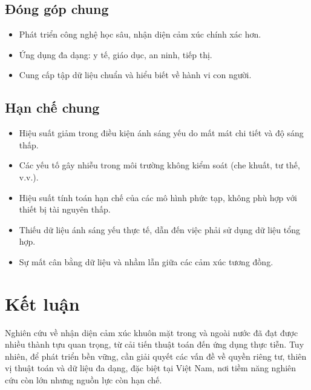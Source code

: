 \subsection*{Đóng góp chung}
\begin{itemize}
    \item Phát triển công nghệ học sâu, nhận diện cảm xúc chính xác hơn.
    \item Ứng dụng đa dạng: y tế, giáo dục, an ninh, tiếp thị.
    \item Cung cấp tập dữ liệu chuẩn và hiểu biết về hành vi con người.
\end{itemize}

\subsection*{Hạn chế chung}
\begin{itemize}
    \item  Hiệu suất giảm trong điều kiện ánh sáng yếu do mất mát chi tiết và độ sáng thấp.
    \item  Các yếu tố gây nhiễu trong môi trường không kiểm soát (che khuất, tư thế, v.v.).
    \item  Hiệu suất tính toán hạn chế của các mô hình phức tạp, không phù hợp với thiết bị tài nguyên thấp.
    \item  Thiếu dữ liệu ánh sáng yếu thực tế, dẫn đến việc phải sử dụng dữ liệu tổng hợp.
    \item  Sự mất cân bằng dữ liệu và nhầm lẫn giữa các cảm xúc tương đồng.
  
\end{itemize}

\section*{Kết luận}
Nghiên cứu về nhận diện cảm xúc khuôn mặt trong và ngoài nước đã đạt được nhiều thành tựu quan trọng, từ cải tiến thuật toán đến ứng dụng thực tiễn. Tuy nhiên, để phát triển bền vững, cần giải quyết các vấn đề về quyền riêng tư, thiên vị thuật toán và dữ liệu đa dạng, đặc biệt tại Việt Nam, nơi tiềm năng nghiên cứu còn lớn nhưng nguồn lực còn hạn chế.